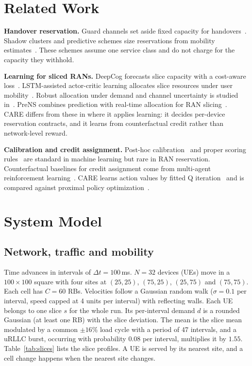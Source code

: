 \documentclass[journal]{IEEEtran}
\begin{document}
\section{Related Work}
\textbf{Handover reservation.} Guard channels set aside fixed capacity for handovers~\cite{hong1986guard}. Shadow clusters and predictive schemes size reservations from mobility estimates~\cite{levine1997shadow,choi1998predictive}. These schemes assume one service class and do not charge for the capacity they withhold.

\textbf{Learning for sliced RANs.} DeepCog forecasts slice capacity with a cost-aware loss~\cite{bega2020deepcog}. LSTM-assisted actor-critic learning allocates slice resources under user mobility~\cite{li2020mobility}. Robust allocation under demand and channel uncertainty is studied in~\cite{gharehgoli2023uncertainty}. PreNS combines prediction with real-time allocation for RAN slicing~\cite{wu2026prens}. CARE differs from these in where it applies learning: it decides per-device reservation contracts, and it learns from counterfactual credit rather than network-level reward.

\textbf{Calibration and credit assignment.} Post-hoc calibration~\cite{platt1999probabilistic,guo2017calibration} and proper scoring rules~\cite{brier1950verification} are standard in machine learning but rare in RAN reservation. Counterfactual baselines for credit assignment come from multi-agent reinforcement learning~\cite{foerster2018coma}. CARE learns action values by fitted Q iteration~\cite{sutton2018rl} and is compared against proximal policy optimization~\cite{schulman2017ppo}.

\section{System Model}\label{sec:model}
\subsection{Network, traffic and mobility}
Time advances in intervals of $\Delta t=100$\,ms. $N=32$ devices (UEs) move in a $100\times100$ square with four sites at $(25,25)$, $(75,25)$, $(25,75)$ and $(75,75)$. Each cell has $C=60$ RBs. Velocities follow a Gaussian random walk ($\sigma=0.1$ per interval, speed capped at 4 units per interval) with reflecting walls. Each UE belongs to one slice $s$ for the whole run. Its per-interval demand $d$ is a rounded Gaussian (at least one RB) with the slice deviation. The mean is the slice mean modulated by a common $\pm16\%$ load cycle with a period of 47 intervals, and a uRLLC burst, occurring with probability $0.08$ per interval, multiplies it by $1.55$. Table~\ref{tab:slices} lists the slice profiles. A UE is served by its nearest site, and a cell change happens when the nearest site changes.
\end{document}
